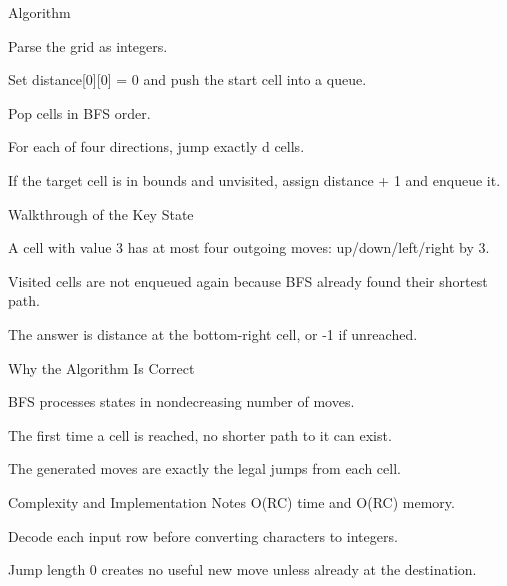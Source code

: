 \documentclass[aspectratio=169,11pt]{beamer}
\begin{document}
\begin{frame}{Algorithm}
\begin{tightitemize}
  \item Parse the grid as integers.
  \item Set distance[0][0] = 0 and push the start cell into a queue.
  \item Pop cells in BFS order.
  \item For each of four directions, jump exactly d cells.
  \item If the target cell is in bounds and unvisited, assign distance + 1 and enqueue it.
\end{tightitemize}
\end{frame}

\begin{frame}{Walkthrough of the Key State}
\begin{tightitemize}
  \item A cell with value 3 has at most four outgoing moves: up/down/left/right by 3.
  \item Visited cells are not enqueued again because BFS already found their shortest path.
  \item The answer is distance at the bottom-right cell, or -1 if unreached.
\end{tightitemize}
\end{frame}

\begin{frame}{Why the Algorithm Is Correct}
\begin{tightitemize}
  \item BFS processes states in nondecreasing number of moves.
  \item The first time a cell is reached, no shorter path to it can exist.
  \item The generated moves are exactly the legal jumps from each cell.
\end{tightitemize}
\end{frame}

\begin{frame}{Complexity and Implementation Notes}
\small
{} O(RC) time and O(RC) memory.

\vspace{0.3cm}
\begin{tightitemize}
  \item Decode each input row before converting characters to integers.
  \item Jump length 0 creates no useful new move unless already at the destination.
\end{tightitemize}
\end{frame}
\end{document}
